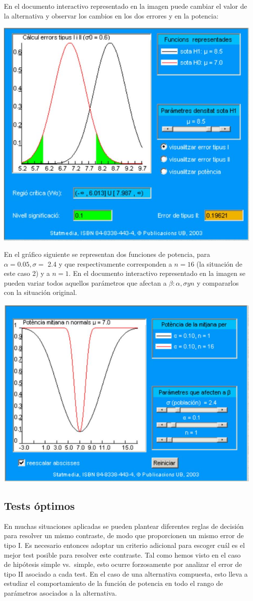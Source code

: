 \documentclass[
]{article}
\begin{document}
En el documento interactivo representado en la imagen puede cambiar el valor de la alternativa y observar los cambios en los dos errores y en la potencia:

\begin{center}\includegraphics[width=0.6\linewidth]{images/cap9-FuncPotencia2} \end{center}

En el gráfico siguiente se representan dos funciones de potencia, para \(\alpha=0.05, \sigma=\) 2.4 y que respectivamente corresponden a \(n=16\) (la situación de este caso 2) y a \(n=1\).
En el documento interactivo representado en la imagen se pueden variar todos aquellos parámetros que afectan a \(\beta: \alpha, \sigma y n\) y compararlos con la situación original.

\begin{center}\includegraphics[width=0.6\linewidth]{images/cap9-FuncPotencia3} \end{center}

\subsection{Tests óptimos}\label{tests-uxf3ptimos}

En muchas situaciones aplicadas se pueden plantear diferentes reglas de decisión para resolver un mismo contraste, de modo que proporcionen un mismo error de tipo I. Es necesario entonces adoptar un criterio adicional para escoger cuál es el mejor test posible para resolver este contraste. Tal como hemos visto en el caso de hipótesis simple vs.~simple, esto ocurre forzosamente por analizar el error de tipo II asociado a cada test. En el caso de una alternativa compuesta, esto lleva a estudiar el comportamiento de la función de potencia en todo el rango de parámetros asociados a la alternativa.
\end{document}
